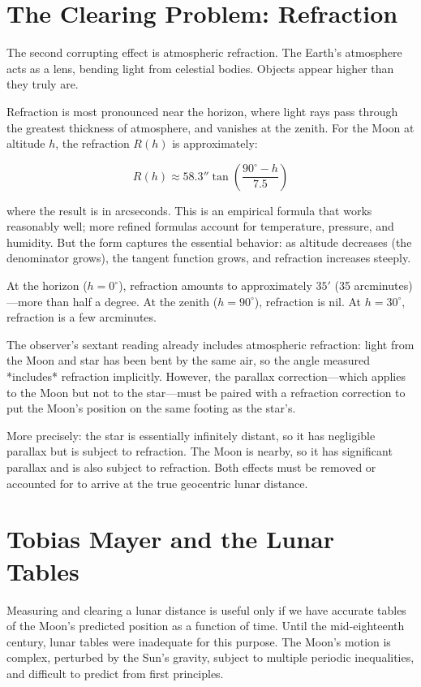 \section{The Clearing Problem: Refraction}

The second corrupting effect is atmospheric refraction. The Earth's atmosphere acts as a lens, bending light from celestial bodies. Objects appear higher than they truly are.

Refraction is most pronounced near the horizon, where light rays pass through the greatest thickness of atmosphere, and vanishes at the zenith. For the Moon at altitude $h$, the refraction $R(h)$ is approximately:

\begin{equation}
R(h) \approx 58.3'' \tan\left(\frac{90^{\circ} - h}{7.5}\right)
\end{equation}

where the result is in arcseconds. This is an empirical formula that works reasonably well; more refined formulas account for temperature, pressure, and humidity. But the form captures the essential behavior: as altitude decreases (the denominator grows), the tangent function grows, and refraction increases steeply.

At the horizon ($h = 0^{\circ}$), refraction amounts to approximately $35'$ (35 arcminutes)—more than half a degree. At the zenith ($h = 90^{\circ}$), refraction is nil. At $h = 30^{\circ}$, refraction is a few arcminutes.

The observer's sextant reading already includes atmospheric refraction: light from the Moon and star has been bent by the same air, so the angle measured *includes* refraction implicitly. However, the parallax correction—which applies to the Moon but not to the star—must be paired with a refraction correction to put the Moon's position on the same footing as the star's.

More precisely: the star is essentially infinitely distant, so it has negligible parallax but is subject to refraction. The Moon is nearby, so it has significant parallax and is also subject to refraction. Both effects must be removed or accounted for to arrive at the true geocentric lunar distance.

\section{Tobias Mayer and the Lunar Tables}

Measuring and clearing a lunar distance is useful only if we have accurate tables of the Moon's predicted position as a function of time. Until the mid-eighteenth century, lunar tables were inadequate for this purpose. The Moon's motion is complex, perturbed by the Sun's gravity, subject to multiple periodic inequalities, and difficult to predict from first principles.

